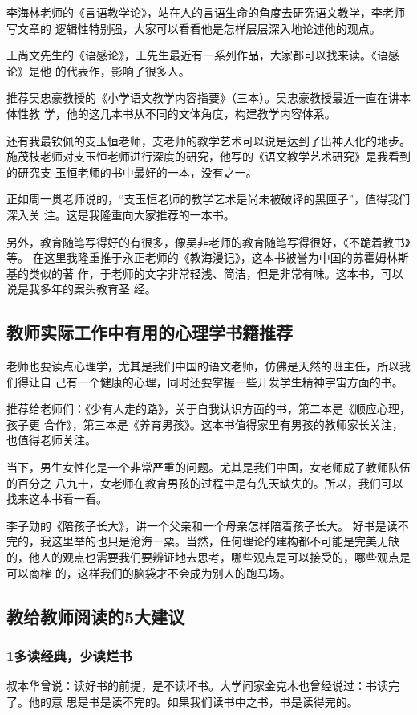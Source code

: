 \documentclass[11pt]{ctexart}
\begin{document}
{{{{李海林老师的《言语教学论》，站在人的言语生命的角度去研究语文教学，李老师写文章的
逻辑性特别强，大家可以看看他是怎样层层深入地论述他的观点。

王尚文先生的《语感论》，王先生最近有一系列作品，大家都可以找来读。《语感论》是他
的代表作，影响了很多人。

推荐吴忠豪教授的《小学语文教学内容指要》（三本）。吴忠豪教授最近一直在讲本体性教
学，他的这几本书从不同的文体角度，构建教学内容体系。

还有我最钦佩的支玉恒老师，支老师的教学艺术可以说是达到了出神入化的地步。
施茂枝老师对支玉恒老师进行深度的研究，他写的《语文教学艺术研究》是我看到的研究支
玉恒老师的书中最好的一本，没有之一。

正如周一贯老师说的，“支玉恒老师的教学艺术是尚未被破译的黑匣子”，值得我们深入关
注。这是我隆重向大家推荐的一本书。

另外，教育随笔写得好的有很多，像吴非老师的教育随笔写得很好，《不跪着教书》等。
在这里我隆重推于永正老师的《教海漫记》，这本书被誉为中国的苏霍姆林斯基的类似的著
作，于老师的文字非常轻浅、简洁，但是非常有味。这本书，可以说是我多年的案头教育圣
经。

\subsection{教师实际工作中有用的心理学书籍推荐}
\label{sec:org5c0d065}
老师也要读点心理学，尤其是我们中国的语文老师，仿佛是天然的班主任，所以我们得让自
己有一个健康的心理，同时还要掌握一些开发学生精神宇宙方面的书。

推荐给老师们：《少有人走的路》，关于自我认识方面的书，第二本是《顺应心理，孩子更
合作》，第三本是《养育男孩》。这本书值得家里有男孩的教师家长关注，也值得老师关注。

当下，男生女性化是一个非常严重的问题。尤其是我们中国，女老师成了教师队伍的百分之
八九十，女老师在教育男孩的过程中是有先天缺失的。所以，我们可以找来这本书看一看。

李子勋的《陪孩子长大》，讲一个父亲和一个母亲怎样陪着孩子长大。
好书是读不完的，我这里举的也只是沧海一粟。当然，任何理论的建构都不可能是完美无缺
的，他人的观点也需要我们要辨证地去思考，哪些观点是可以接受的，哪些观点是可以商榷
的，这样我们的脑袋才不会成为别人的跑马场。

\subsection{教给教师阅读的5大建议}
\label{sec:orgdc98c2c}
\subsubsection{1多读经典，少读烂书}
\label{sec:orgd6b818d}
叔本华曾说：读好书的前提，是不读坏书。大学问家金克木也曾经说过：书读完了。他的意
思是书是读不完的。如果我们读书中之书，书是读得完的。

}}}}
\end{document}
